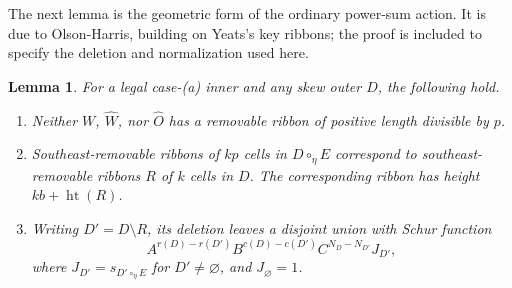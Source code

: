 \documentclass[11pt,a4paper]{amsart}
\numberwithin{equation}{section}
\theoremstyle{plain}
\newtheorem{lemma}[theorem]{Lemma}
\theoremstyle{definition}
\begin{document}
The next lemma is the geometric form of the ordinary power-sum action.  It is due to Olson-Harris, building on Yeats's key ribbons; the proof is included to specify the deletion and normalization used here.

\begin{lemma}\label{lem:ribbon-deletion}
For a legal case-(a) inner and any skew outer \(D\), the following hold.
\begin{enumerate}
\item Neither \(W\), \(\widehat W\), nor \(\widehat O\) has a removable ribbon of positive length divisible by \(p\).
\item Southeast-removable ribbons of \(kp\) cells in \(D\circ_\eta E\) correspond to southeast-removable ribbons \(R\) of \(k\) cells in \(D\).  The corresponding ribbon has height \(kb+\operatorname{ht}(R)\).
\item Writing \(D'=D\setminus R\), its deletion leaves a disjoint union with Schur function
\begin{equation}\label{eq:ribbon-remainder}
 A^{r(D)-r(D')}B^{c(D)-c(D')}C^{N_D-N_{D'}}J_{D'},
\end{equation}
where \(J_{D'}=s_{D'\circ_\eta E}\) for \(D'\ne\varnothing\), and \(J_\varnothing=1\).
\end{enumerate}
\end{lemma}
\end{document}
